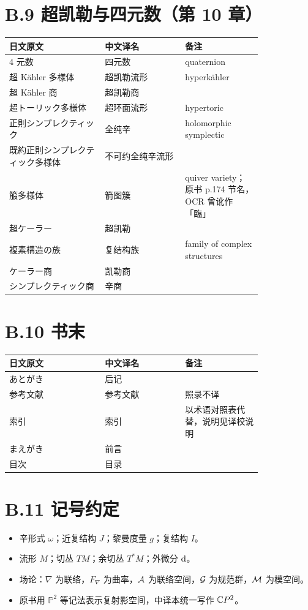 \section*{B.9 超凯勒与四元数（第 10 章）}
{\small
\begin{longtable}{p{0.31\linewidth} p{0.26\linewidth} p{0.25\linewidth}}
\toprule
日文原文 & 中文译名 & 备注 \\
\midrule
\endhead
4 元数 & 四元数 & quaternion \\
超 Kähler 多様体 & 超凯勒流形 & hyperkähler \\
超 Kähler 商 & 超凯勒商 &  \\
超トーリック多様体 & 超环面流形 & hypertoric \\
正則シンプレクティック & 全纯辛 & holomorphic symplectic \\
既約正則シンプレクティック多様体 & 不可约全纯辛流形 &  \\
箙多様体 & 箭图簇 & quiver variety；原书 p.174 节名，OCR 曾讹作「臨」 \\
超ケーラー & 超凯勒 &  \\
複素構造の族 & 复结构族 & family of complex structures \\
ケーラー商 & 凯勒商 &  \\
シンプレクティック商 & 辛商 &  \\
\bottomrule
\end{longtable}
}

\section*{B.10 书末}
{\small
\begin{longtable}{p{0.31\linewidth} p{0.26\linewidth} p{0.25\linewidth}}
\toprule
日文原文 & 中文译名 & 备注 \\
\midrule
\endhead
あとがき & 后记 &  \\
参考文献 & 参考文献 & 照录不译 \\
索引 & 索引 & 以术语对照表代替，说明见译校说明 \\
まえがき & 前言 &  \\
目次 & 目录 &  \\
\bottomrule
\end{longtable}
}

\section*{B.11 记号约定}

\begin{itemize}[leftmargin=1.6em,itemsep=3pt]
\item 辛形式 $\omega$；近复结构 $J$；黎曼度量 $g$；复结构 $I$。
\item 流形 $M$；切丛 $TM$；余切丛 $T^*M$；外微分 $\mathrm{d}$。
\item 场论：$\nabla$ 为联络，$F_\nabla$ 为曲率，$\mathcal{A}$ 为联络空间，$\mathcal{G}$ 为规范群，$\mathcal{M}$ 为模空间。
\item 原书用 $\mathbb{P}^2$ 等记法表示复射影空间，中译本统一写作 $\mathbb{C}P^2$。
\end{itemize}
